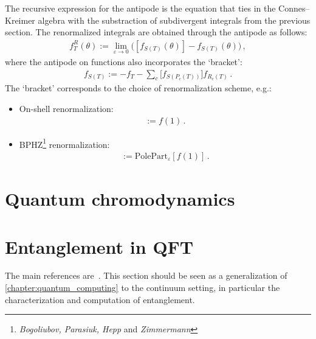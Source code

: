     The recursive expression for the antipode is the equation that ties in the Connes--Kreimer algebra with the substraction of subdivergent integrals from the previous section. The renormalized integrals are obtained through the antipode as follows:
    \begin{gather}
        f_T^R(\theta) := \lim_{\varepsilon\rightarrow0}\bigl([f_{S(T)}(\theta)] - f_{S(T)}(\theta)\bigr)\,,
    \end{gather}
    where the antipode on functions also incorporates the `bracket':
    \begin{gather}
        f_{S(T)} := -f_T - \sum_c\bigl[f_{S\left(P_c(T)\right)}\bigr]f_{R_c(T)}\,.
    \end{gather}
    The `bracket' corresponds to the choice of renormalization scheme, e.g.:
    \begin{itemize}
        \item On-shell renormalization:
        \begin{gather}
            [f(\theta)] := f(1)\,.
        \end{gather}
        \item BPHZ\footnote{\textit{Bogoliubov, Parasiuk, Hepp} and \textit{Zimmermann}} renormalization:
        \begin{gather}
            [f(\theta)] := \mathrm{PolePart}_\varepsilon[f(1)]\,.
        \end{gather}
    \end{itemize}


\section{Quantum chromodynamics}


\section{Entanglement in QFT}

    The main references are~\citet{tuybens_entanglement_2017,rangamani_holographic_2017}. This section should be seen as a generalization of \cref{chapter:quantum_computing} to the continuum setting, in particular the characterization and computation of entanglement.

